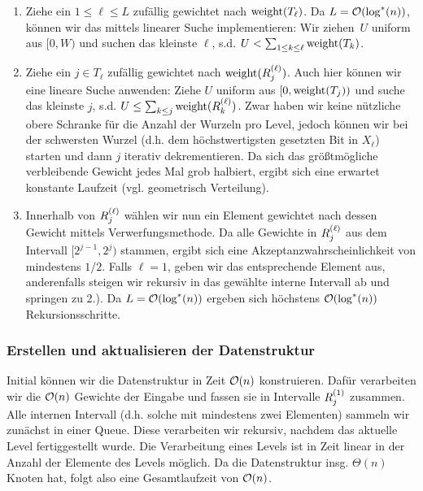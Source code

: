 \begin{enumerate}
    \item Ziehe ein $1 \le \ell \le L$ zufällig gewichtet nach $\mathrm{weight}(T_\ell)$.
          Da $L = \mathcal{O}\!\left(\log^*(n)\right)$, können wir das mittels linearer Suche implementieren:
          Wir ziehen~$U$ uniform aus $[0, W)$ und suchen das kleinste $\ell$, s.d. $U < \sum_{1\le k \le \ell} \mathrm{weight}(T_k)$.

    \item Ziehe ein $j \in T_\ell$ zufällig gewichtet nach $\mathrm{weight}(R^{(\ell)}_{j})$.
          Auch hier können wir eine lineare Suche anwenden:
          Ziehe $U$ uniform aus $[0, \mathrm{weight}(T_j))$ und suche das kleinste $j$, s.d. $U \le \sum_{k \le j} \mathrm{weight}(R^{(\ell)}_{k})$.
          Zwar haben wir keine nützliche obere Schranke für die Anzahl der Wurzeln pro Level, jedoch können wir bei der schwersten Wurzel (d.h. dem höchstwertigsten gesetzten Bit in $X_\ell$) starten und dann $j$ iterativ dekrementieren.
          Da sich das größtmögliche verbleibende Gewicht jedes Mal grob halbiert, ergibt sich eine erwartet konstante Laufzeit (vgl. geometrisch Verteilung).

    \item Innerhalb von $R^{(\ell)}_{j}$ wählen wir nun ein Element gewichtet nach dessen Gewicht mittels Verwerfungsmethode.
          Da alle Gewichte in $R^{(\ell)}_{j}$ aus dem Intervall $[2^{j-1}, 2^j)$ stammen, ergibt sich eine Akzeptanzwahrscheinlichkeit von mindestens $1/2$.
          Falls $\ell = 1$, geben wir das entsprechende Element aus, anderenfalls steigen wir rekursiv in das gewählte interne Intervall ab und springen zu 2.).
          Da $L = \mathcal{O}\!\left(\log^*(n)\right)$ ergeben sich höchstens $\mathcal{O}\!\left(\log^*(n)\right)$ Rekursionsschritte.
\end{enumerate}

\subsubsection{Erstellen und aktualisieren der Datenstruktur}
Initial können wir die Datenstruktur in Zeit $\mathcal{O}\!\left(n\right)$ konstruieren.
Dafür verarbeiten wir die $\mathcal{O}\!\left(n\right)$ Gewichte der Eingabe und fassen sie in Intervalle $R^{(1)}_{j}$ zusammen.
Alle internen Intervall (d.h. solche mit mindestens zwei Elementen) sammeln wir zunächst in einer Queue.
Diese verarbeiten wir rekursiv, nachdem das aktuelle Level fertiggestellt wurde.
Die Verarbeitung eines Levels ist in Zeit linear in der Anzahl der Elemente des Levels möglich.
Da die Datenstruktur insg. $\Theta(n)$ Knoten hat, folgt also eine Gesamtlaufzeit von $\mathcal{O}\!\left(n\right)$.

